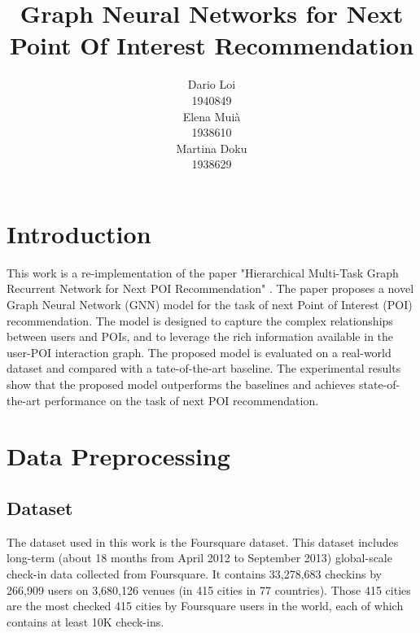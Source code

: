 \documentclass[twocolumn,twoside]{article}
\title{Graph Neural Networks for Next Point Of Interest Recommendation
}
\author{
  Dario Loi\\
  1940849\\
   \And
  Elena Muià \\
  1938610 \\
  \And
  Martina Doku \\
  1938629\\
}
\begin{document}


\section{Introduction}
This work is a re-implementation of the paper "Hierarchical Multi-Task Graph Recurrent Network for Next POI Recommendation" \cite{main_paper}.
The paper proposes a novel Graph Neural Network (GNN) model for the task of
next Point of Interest (POI) recommendation. The model is designed to
capture the complex relationships between users and POIs, and to
leverage the rich information available in the user-POI interaction
graph. The proposed model is evaluated on a real-world dataset and
compared with a tate-of-the-art baseline. The experimental results
show that the proposed model outperforms the baselines and
achieves state-of-the-art performance on the task of next POI recommendation.


\section{Data Preprocessing}
\subsection{Dataset}
The dataset used in this work is the Foursquare dataset\cite{foursquare}. This dataset includes
long-term (about 18 months from April 2012 to September 2013) global-scale
check-in data collected from Foursquare. It contains 33,278,683 checkins by
266,909 users on 3,680,126 venues (in 415 cities in 77 countries).
Those 415 cities are the most checked 415 cities by Foursquare users in the world,
each of which contains at least 10K check-ins.
\end{document}
